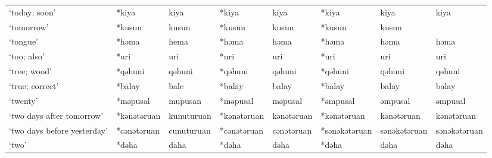 \begin{landscape}
\begin{longtable}[c]{@{}p{3cm}<{\raggedright}p{2.75cm}<{\raggedright}p{2.75cm}<{\raggedright}p{2.75cm}<{\raggedright}p{2.75cm}<{\raggedright}p{2.75cm}<{\raggedright}p{2.75cm}<{\raggedright}p{2.75cm}<{\raggedright}@{}}
`today; soon'                                        & *kiya        & kiya                          & *kiya          & kiya                       & *kiya            & kiya                     & kiya                              \\
`tomorrow'                                           & *kusun       & kusun                         & *kusun         & kusun                      & *kusun           & kusun                    &                                   \\
`tongue'                                             & *həma        & hema                          & *həma          & həma                       & *həma            & həma                     & həma                              \\
`too; also'                                          & *uri         & uri                           & *uri           & uri                        & *uri             & uri                      & uri                               \\
`tree; wood'                                         & *qəhuni      & qəhuni                        & *qəhuni        & qəhuni                     & *qəhuni          & qəhuni                   & qəhuni                            \\
`true; correct'                                      & *balay       & bale                          & *balay         & balay                      & *balay           & balay                    & balay                             \\
`twenty'                                             & *məpusal     & mupusan                       & *məpusal       & məpusal                    & *əmpusal         & əmpusal                  & əmpusal                           \\
`two days after tomorrow'                            & *kənətəruan  & kunuturuan                    & *kənətəruan    & kənətəruan                 & *kənətəruan      & kənətəruan               & kənətəruan                        \\
`two days before yesterday'                          & *cənətəruan  & cunuturuan                    & *cənətəruan    & cənətəruan                 & *sənəkətəruan    & sənəkətəruan             & sənəkətəruan                      \\
`two'                                                & *dəha        & daha                          & *dəha          & dəha                       & *dəha            & dəha                     & dəha                              \\

\end{longtable}
\end{landscape}
